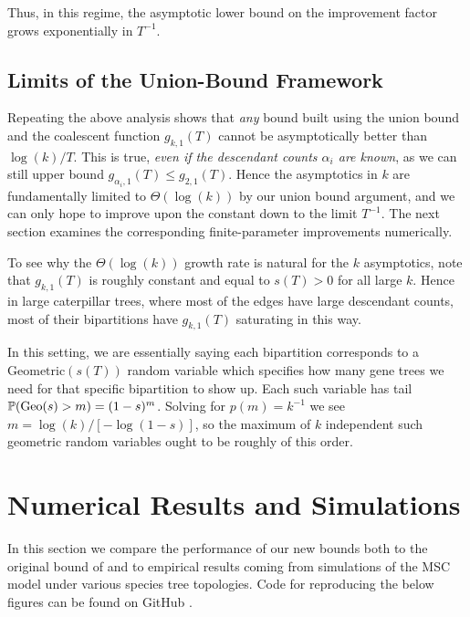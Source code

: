 Thus, in this regime, the asymptotic lower bound on the improvement factor grows
exponentially in $T^{-1}$.

\subsection{Limits of the Union-Bound Framework}
\label{sec:union-bound-limitations}

Repeating the above analysis shows that \textit{any} bound built using the union bound and the coalescent function $g_{k,1}(T)$ cannot be asymptotically better than $\log(k)/T$. This is true, \textit{even if the descendant counts $\alpha_i$ are known}, as we can still upper bound $g_{\alpha_i, 1}(T) \leq g_{2,1}(T)$. Hence the asymptotics in $k$ are fundamentally limited to $\Theta(\log(k))$ by our union bound argument, and we can only hope to improve upon the constant down to the limit $T^{-1}$. The next section examines the corresponding finite-parameter improvements numerically.


To see why the $\Theta(\log(k))$ growth rate is natural for the $k$ asymptotics,
note that $g_{k,1}(T)$ is roughly constant and equal to $s(T) > 0$ for all large $k$.
Hence in large caterpillar trees, where most of the edges have large descendant counts,
most of their bipartitions have $g_{k,1}(T)$ saturating in this way.

In this setting, we are essentially saying each bipartition corresponds to
a $\mathrm{Geometric}(s(T))$ random variable which specifies how many gene trees we need
for that specific bipartition to show up. Each such variable has tail
 $\P(\mathrm{Geo}(s) > m) = (1-s)^{m}$. Solving for $p(m) = k^{-1}$ we see
 $m = \log(k)/[-\log(1-s)]$, so the maximum of $k$ independent such geometric random
 variables ought to be roughly of this order.

\section{Numerical Results and Simulations}
\label{sec:simulations}

In this section we compare the performance of our new bounds both to
the original bound of \citet{uricchio2016_bipartition_cover} and to empirical
results coming from simulations of the MSC model under various species tree topologies.
Code for reproducing the below figures can be found on GitHub \citep{mcnulty2025_msc_bipartition_cover_code}.


